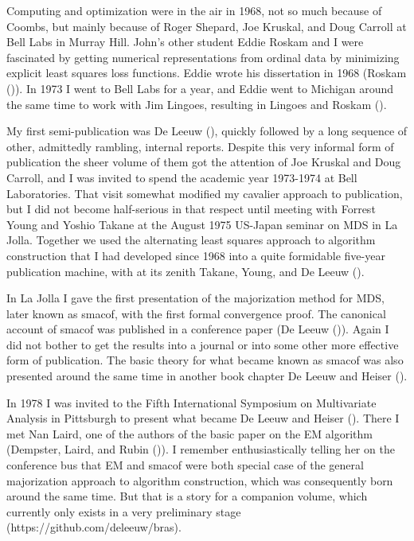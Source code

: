 \documentclass[
  12pt,
  letterpaper,
  DIV=11,
  numbers=noendperiod]{scrreprt}
\theoremstyle{remark}
\begin{document}
Computing and optimization were in the air in 1968, not so much because
of Coombs, but mainly because of Roger Shepard, Joe Kruskal, and Doug
Carroll at Bell Labs in Murray Hill. John's other student Eddie Roskam
and I were fascinated by getting numerical representations from ordinal
data by minimizing explicit least squares loss functions. Eddie wrote
his dissertation in 1968 (Roskam ()). In
1973 I went to Bell Labs for a year, and Eddie went to Michigan around
the same time to work with Jim Lingoes, resulting in Lingoes and Roskam
().

My first semi-publication was De Leeuw
(), quickly followed by a long
sequence of other, admittedly rambling, internal reports. Despite this
very informal form of publication the sheer volume of them got the
attention of Joe Kruskal and Doug Carroll, and I was invited to spend
the academic year 1973-1974 at Bell Laboratories. That visit somewhat
modified my cavalier approach to publication, but I did not become
half-serious in that respect until meeting with Forrest Young and Yoshio
Takane at the August 1975 US-Japan seminar on MDS in La Jolla. Together
we used the alternating least squares approach to algorithm construction
that I had developed since 1968 into a quite formidable five-year
publication machine, with at its zenith Takane, Young, and De Leeuw
().

In La Jolla I gave the first presentation of the majorization method for
MDS, later known as smacof, with the first formal convergence proof. The
canonical account of smacof was published in a conference paper (De
Leeuw ()). Again I did not bother to
get the results into a journal or into some other more effective form of
publication. The basic theory for what became known as smacof was also
presented around the same time in another book chapter De Leeuw and
Heiser ().

In 1978 I was invited to the Fifth International Symposium on
Multivariate Analysis in Pittsburgh to present what became De Leeuw and
Heiser (). There I met Nan
Laird, one of the authors of the basic paper on the EM algorithm
(Dempster, Laird, and Rubin
()). I remember
enthusiastically telling her on the conference bus that EM and smacof
were both special case of the general majorization approach to algorithm
construction, which was consequently born around the same time. But that
is a story for a companion volume, which currently only exists in a very
preliminary stage (https://github.com/deleeuw/bras).
\end{document}
